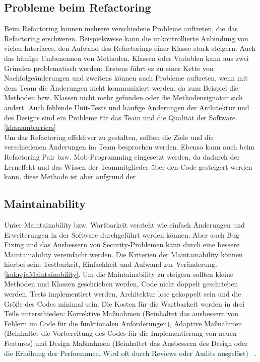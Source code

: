 \subsection{Probleme beim Refactoring}
Beim Refactoring können mehrere verschiedene Probleme auftreten, die das Refactoring erschweren. Beispielsweise kann die unkontrollierte Anbindung von vielen Interfaces, den Aufwand des Refactorings einer Klasse stark steigern. Auch das häufige Umbenennen von Methoden, Klassen oder Variablen kann aus zwei Gründen problematisch werden: Erstens führt es zu einer Kette von Nachfolgeänderungen und zweitens können auch Probleme auftreten, wenn mit dem Team die Änderungen nicht kommuniziert werden, da zum Beispiel die Methoden bzw. Klassen nicht mehr gefunden oder die Methodensignatur sich ändert. Auch fehlende Unit-Tests und häufige Änderungen der Architektur und des Designs sind ein Probleme für das Team und die Qualität der Software. \ref{khanambarriers} \\
Um das Refactoring effektiver zu gestalten, sollten die Ziele und die verschiedenen Änderungen im Team besprochen werden. Ebenso kann auch beim Refactoring Pair bzw. Mob-Programming eingesetzt werden, da dadurch der Lerneffekt und das Wissen der Teammitglieder über den Code gesteigert werden kann, diese Methode ist aber aufgrund der 
\subsection{Maintainability}
Unter Maintainability bzw. Wartbarkeit versteht wie einfach Änderungen und Erweiterungen in der Software durchgeführt werden können. Aber auch Bug Fixing und das Ausbessern von Security-Problemen kann durch eine bessere Maintainability vereinfacht werden. Die Kriterien der Maintainability können hierbei sein: Testbarkeit, Einfachheit und Aufwand zur Veränderung. \ref{kukrejaMaintainability}. Um die Maintainability zu steigern sollten kleine Methoden und Klassen geschrieben werden, Code nicht doppelt geschrieben werden, Tests implementiert werden, Architektur lose gekoppelt sein und die Größe des Codes minimal sein. Die Kosten für die Wartbarkeit werden in drei Teile unterschieden: Korrektive Maßnahmen (Beinhaltet das ausbessern von Fehlern im Code für die funktionalen Anforderungen), Adaptive Maßnahmen (Beinhaltet die Vorbereitung des Codes für die Implementierung von neuen Features) und Design Maßnahmen (Beinhaltet das Ausbessern des Design oder die Erhöhung der Performance. Wird oft durch Reviews oder Audits ausgelöst) ~\parencite{cheaitoMaintainability}.
